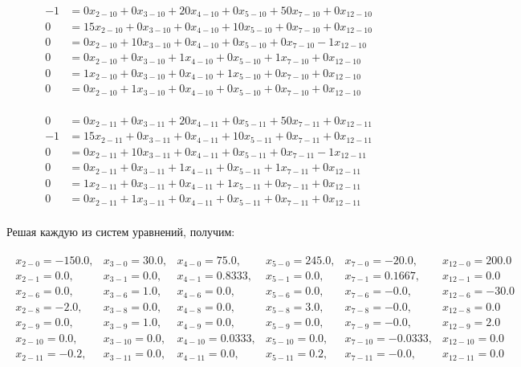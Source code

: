 \vspace{-\baselineskip}\begin{align*}
-1 &= 0x_{2-10}+0x_{3-10}+20x_{4-10}+0x_{5-10}+50x_{7-10}+0x_{12-10} \\ 
	0 &= 15x_{2-10}+0x_{3-10}+0x_{4-10}+10x_{5-10}+0x_{7-10}+0x_{12-10} \\ 
	0 &= 0x_{2-10}+10x_{3-10}+0x_{4-10}+0x_{5-10}+0x_{7-10}-1x_{12-10} \\ 
	0 &= 0x_{2-10}+0x_{3-10}+1x_{4-10}+0x_{5-10}+1x_{7-10}+0x_{12-10} \\ 
	0 &= 1x_{2-10}+0x_{3-10}+0x_{4-10}+1x_{5-10}+0x_{7-10}+0x_{12-10} \\ 
	0 &= 0x_{2-10}+1x_{3-10}+0x_{4-10}+0x_{5-10}+0x_{7-10}+0x_{12-10} \\
\end{align*}

\vspace{-\baselineskip}\begin{align*}
0 &= 0x_{2-11}+0x_{3-11}+20x_{4-11}+0x_{5-11}+50x_{7-11}+0x_{12-11} \\ 
	-1 &= 15x_{2-11}+0x_{3-11}+0x_{4-11}+10x_{5-11}+0x_{7-11}+0x_{12-11} \\ 
	0 &= 0x_{2-11}+10x_{3-11}+0x_{4-11}+0x_{5-11}+0x_{7-11}-1x_{12-11} \\ 
	0 &= 0x_{2-11}+0x_{3-11}+1x_{4-11}+0x_{5-11}+1x_{7-11}+0x_{12-11} \\ 
	0 &= 1x_{2-11}+0x_{3-11}+0x_{4-11}+1x_{5-11}+0x_{7-11}+0x_{12-11} \\ 
	0 &= 0x_{2-11}+1x_{3-11}+0x_{4-11}+0x_{5-11}+0x_{7-11}+0x_{12-11} \\
\end{align*}

\normalsize

Решая каждую из систем уравнений, получим:

\footnotesize

\vspace{-\baselineskip}\begin{align*}
\begin{array}{cccccc}
	x_{2-0} = -150.0, & x_{3-0} = 30.0, & x_{4-0} = 75.0, & x_{5-0} = 245.0, & x_{7-0} = -20.0, & x_{12-0} = 200.0 \\ 
	x_{2-1} = 0.0, & x_{3-1} = 0.0, & x_{4-1} = 0.8333, & x_{5-1} = 0.0, & x_{7-1} = 0.1667, & x_{12-1} = 0.0 \\ 
	x_{2-6} = 0.0, & x_{3-6} = 1.0, & x_{4-6} = 0.0, & x_{5-6} = 0.0, & x_{7-6} = -0.0, & x_{12-6} = -30.0 \\ 
	x_{2-8} = -2.0, & x_{3-8} = 0.0, & x_{4-8} = 0.0, & x_{5-8} = 3.0, & x_{7-8} = -0.0, & x_{12-8} = 0.0 \\ 
	x_{2-9} = 0.0, & x_{3-9} = 1.0, & x_{4-9} = 0.0, & x_{5-9} = 0.0, & x_{7-9} = -0.0, & x_{12-9} = 2.0 \\ 
	x_{2-10} = 0.0, & x_{3-10} = 0.0, & x_{4-10} = 0.0333, & x_{5-10} = 0.0, & x_{7-10} = -0.0333, & x_{12-10} = 0.0 \\ 
	x_{2-11} = -0.2, & x_{3-11} = 0.0, & x_{4-11} = 0.0, & x_{5-11} = 0.2, & x_{7-11} = -0.0, & x_{12-11} = 0.0 
\end{array}
\end{align*}


